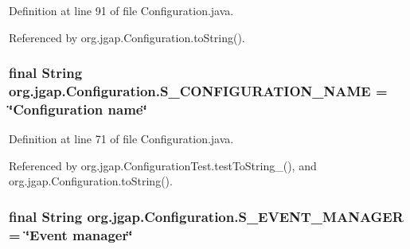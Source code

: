 Definition at line 91 of file Configuration.\-java.



Referenced by org.\-jgap.\-Configuration.\-to\-String().

\hypertarget{classorg_1_1jgap_1_1_configuration_aaa363254f293f84f3a5df787d7f58827}{
\subsubsection[{S\-\_\-\-C\-O\-N\-F\-I\-G\-U\-R\-A\-T\-I\-O\-N\-\_\-\-N\-A\-M\-E}]{\setlength{\rightskip}{0pt plus 5cm}final String org.\-jgap.\-Configuration.\-S\-\_\-\-C\-O\-N\-F\-I\-G\-U\-R\-A\-T\-I\-O\-N\-\_\-\-N\-A\-M\-E = \char`\"{}Configuration name\char`\"{}\hspace{0.3cm}{\ttfamily [static]}}}\label{classorg_1_1jgap_1_1_configuration_aaa363254f293f84f3a5df787d7f58827}


Definition at line 71 of file Configuration.\-java.



Referenced by org.\-jgap.\-Configuration\-Test.\-test\-To\-String\-\_(), and org.\-jgap.\-Configuration.\-to\-String().

\hypertarget{classorg_1_1jgap_1_1_configuration_a8283161a07fe963e449e918d482bfc77}{
\subsubsection[{S\-\_\-\-E\-V\-E\-N\-T\-\_\-\-M\-A\-N\-A\-G\-E\-R}]{\setlength{\rightskip}{0pt plus 5cm}final String org.\-jgap.\-Configuration.\-S\-\_\-\-E\-V\-E\-N\-T\-\_\-\-M\-A\-N\-A\-G\-E\-R = \char`\"{}Event manager\char`\"{}\hspace{0.3cm}{\ttfamily [static]}}}\label{classorg_1_1jgap_1_1_configuration_a8283161a07fe963e449e918d482bfc77}



